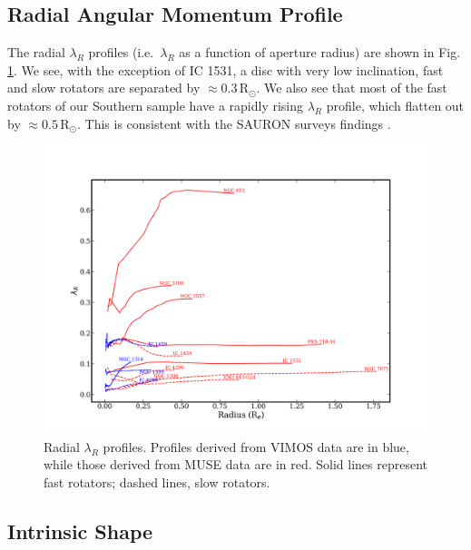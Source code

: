 	\subsection{Radial Angular Momentum Profile}
		\label{subsec:ResolvedLambda_R}
		The radial $\lambda_R$ profiles (i.e.\ $\lambda_R$ as a function of aperture radius) are shown in Fig.\,\ref{fig:lambdaR_profile}. We see, with the exception of IC 1531, a disc with very low inclination, fast and slow rotators are separated by $\approx 0.3\,\mathrm{R_\odot}$. We also see that most of the fast rotators of our Southern sample have a rapidly rising $\lambda_R$ profile, which flatten out by $\approx 0.5\,\mathrm{R_\odot}$. This is consistent with the SAURON surveys findings \citep[e.g.][Fig.\,2]{Emsellem2007}. 

		\begin{figure}[t]
			\centering
			\includegraphics[width=\textwidth]{chapter4/lambda_R.png}
			\caption[$\lambda_{R}$ radial profiles]{Radial $\lambda_{R}$ profiles. Profiles derived from VIMOS data are in blue, while those derived from MUSE data are in red. Solid lines represent fast rotators; dashed lines, slow rotators.}
			\label{fig:lambdaR_profile}
		\end{figure}

		
		\subsection{Intrinsic Shape}
			\label{subsec:Misalignment}

